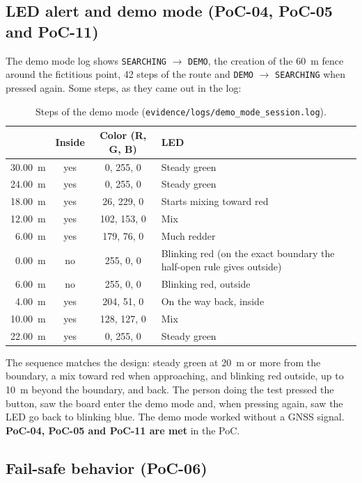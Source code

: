 \subsection{LED alert and demo mode (PoC-04, PoC-05 and PoC-11)}

The demo mode log shows \texttt{SEARCHING} $\to$ \texttt{DEMO}, the creation of the 60~m fence around the
fictitious point, 42 steps of the route and \texttt{DEMO} $\to$ \texttt{SEARCHING} when pressed again. Some
steps, as they came out in the log:

\begin{table}[H]
\centering
\small
\begin{tabularx}{\textwidth}{|r c c X|}
\hline
\tablehead{\textbf{Distance to the boundary} & \textbf{Inside} & \textbf{Color (R, G, B)} & \textbf{LED}} \\ \hline
30.00~m & yes & 0, 255, 0 & Steady green \\ \hline
24.00~m & yes & 0, 255, 0 & Steady green \\ \hline
18.00~m & yes & 26, 229, 0 & Starts mixing toward red \\ \hline
12.00~m & yes & 102, 153, 0 & Mix \\ \hline
6.00~m & yes & 179, 76, 0 & Much redder \\ \hline
0.00~m & no & 255, 0, 0 & Blinking red (on the exact boundary the half-open rule gives outside) \\ \hline
6.00~m & no & 255, 0, 0 & Blinking red, outside \\ \hline
4.00~m & yes & 204, 51, 0 & On the way back, inside \\ \hline
10.00~m & yes & 128, 127, 0 & Mix \\ \hline
22.00~m & yes & 0, 255, 0 & Steady green \\ \hline
\end{tabularx}
\caption{Steps of the demo mode (\texttt{evidence/logs/demo\_mode\_session.log}).}
\end{table}

The sequence matches the design: steady green at 20~m or more from the boundary, a mix toward red when
approaching, and blinking red outside, up to 10~m beyond the boundary, and back. The person doing the test
pressed the button, saw the board enter the demo mode and, when pressing again, saw the LED go back to
blinking blue. The demo mode worked without a GNSS signal. \textbf{PoC-04, PoC-05 and PoC-11 are met} in the
PoC.

\subsection{Fail-safe behavior (PoC-06)}

